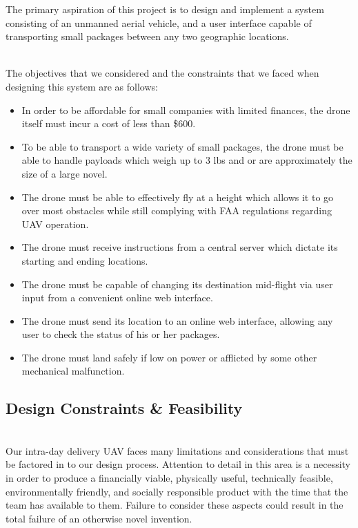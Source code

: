 \documentclass[12pt]{extarticle}
\begin{document}
The primary aspiration of this project is to design and implement a system consisting of an unmanned aerial vehicle, and a user interface capable of transporting small packages between any two geographic locations.  

\ \\
The objectives that we considered and the constraints that we faced when designing this system are as follows:

\begin{itemize}
    \setlength\itemsep{-0.1em}

    \item In order to be affordable for small companies with limited finances, the drone itself must incur a cost of less than \$600.
    \item To be able to transport a wide variety of small packages, the drone must be able to handle payloads which weigh up to 3 lbs and or are approximately the size of a large novel.
    \item The drone must be able to effectively fly at a height which allows it to go over most obstacles while still complying with FAA regulations regarding UAV operation.
    \item The drone must receive instructions from a central server which dictate its starting and ending locations.
    \item The drone must be capable of changing its destination mid-flight via user input from a convenient online web interface.
    \item The drone must send its location to an online web interface, allowing any user to check the status of his or her packages.
    \item The drone must land safely if low on power or afflicted by some other mechanical malfunction.

\end{itemize}
\par

\subsection{Design Constraints \& Feasibility}

\ \\
Our intra-day delivery UAV faces many limitations and considerations that must be factored in to our design process.  Attention to detail in this area is a necessity in order to produce a financially viable, physically useful, technically feasible, environmentally friendly, and socially responsible product with the time that the team has available to them.  Failure to consider these aspects could result in the total failure of an otherwise novel invention.  
\end{document}

